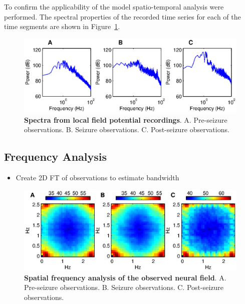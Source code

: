 \documentclass[]{article}
\begin{document}
To confirm the applicability of the model spatio-temporal analysis were performed. The spectral properties of the recorded time series for each of the time segments are shown in Figure~\ref{fig:TemporalFreqObservation}.

\begin{figure}[!ht]
\begin{center}
\includegraphics{./Figures/TemporalFreq.eps}
\end{center}
\caption{{\bf Spectra from local field potential recordings}. A. Pre-seizure observations. B. Seizure observations. C. Post-seizure observations.}
\label{fig:TemporalFreqObservation}
\end{figure}

\subsection{Frequency Analysis}
\begin{itemize}
	\item Create 2D FT of observations to estimate bandwidth
\end{itemize}

\begin{figure}[!ht]
\begin{center}
\includegraphics{./Figures/SpatialFreq.eps}
\end{center}
\caption{{\bf Spatial frequency analysis of the observed neural field}. A. Pre-seizure observations. B. Seizure observations. C. Post-seizure observations.}
\label{fig:SpatialFreqObservation}
\end{figure}
\end{document}

